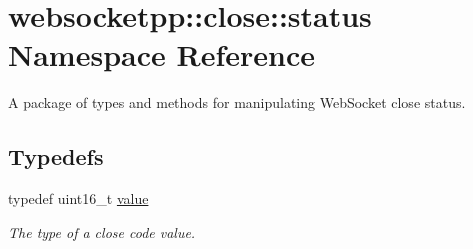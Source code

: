 \hypertarget{namespacewebsocketpp_1_1close_1_1status}{}\section{websocketpp\+:\+:close\+:\+:status Namespace Reference}
\label{namespacewebsocketpp_1_1close_1_1status}


A package of types and methods for manipulating Web\+Socket close status\textquotesingle{}.  


\subsection*{Typedefs}
\begin{DoxyCompactItemize}
\item 
typedef uint16\+\_\+t \hyperlink{namespacewebsocketpp_1_1close_1_1status_a8614a5c4733d708e2d2a32191c5bef84}{value}
\begin{DoxyCompactList}\small\item\em The type of a close code value. \end{DoxyCompactList}\end{DoxyCompactItemize}
